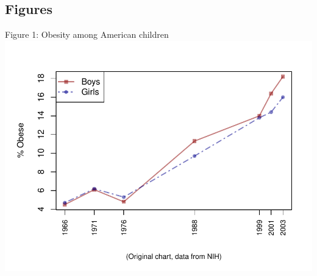 \documentclass[11pt]{article}
\begin{document}
\subsection*{Figures}
\begin{center}
Figure 1: Obesity among American children\cite{NIH}
\includegraphics{loi-001}
\end{center}

\newpage


\end{document}
